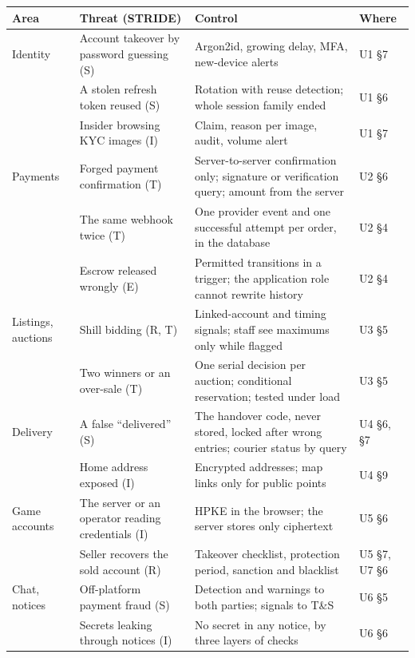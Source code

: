 \documentclass[11pt,a4paper]{article}
\begin{document}
{\small
\begin{longtable}{@{}>{\raggedright\arraybackslash}p{2.0cm}>{\raggedright\arraybackslash}p{5.2cm}>{\raggedright\arraybackslash}p{6.0cm}>{\raggedright\arraybackslash}p{1.8cm}@{}}
\toprule
\textbf{Area} & \textbf{Threat (STRIDE)} & \textbf{Control} & \textbf{Where} \\ \midrule \endhead
Identity & Account takeover by password guessing (S) & Argon2id, growing delay, MFA, new-device alerts & U1 \S7 \\
 & A stolen refresh token reused (S) & Rotation with reuse detection; whole session family ended & U1 \S6 \\
 & Insider browsing KYC images (I) & Claim, reason per image, audit, volume alert & U1 \S7 \\
Payments & Forged payment confirmation (T) & Server-to-server confirmation only; signature or verification query; amount from the server & U2 \S6 \\
 & The same webhook twice (T) & One provider event and one successful attempt per order, in the database & U2 \S4 \\
 & Escrow released wrongly (E) & Permitted transitions in a trigger; the application role cannot rewrite history & U2 \S4 \\
Listings, auctions & Shill bidding (R, T) & Linked-account and timing signals; staff see maximums only while flagged & U3 \S5 \\
 & Two winners or an over-sale (T) & One serial decision per auction; conditional reservation; tested under load & U3 \S5 \\
Delivery & A false ``delivered'' (S) & The handover code, never stored, locked after wrong entries; courier status by query & U4 \S6, \S7 \\
 & Home address exposed (I) & Encrypted addresses; map links only for public points & U4 \S9 \\
Game accounts & The server or an operator reading credentials (I) & HPKE in the browser; the server stores only ciphertext & U5 \S6 \\
 & Seller recovers the sold account (R) & Takeover checklist, protection period, sanction and blacklist & U5 \S7, U7 \S6 \\
Chat, notices & Off-platform payment fraud (S) & Detection and warnings to both parties; signals to T\&S & U6 \S5 \\
 & Secrets leaking through notices (I) & No secret in any notice, by three layers of checks & U6 \S6 \\

\end{longtable}}
\end{document}
